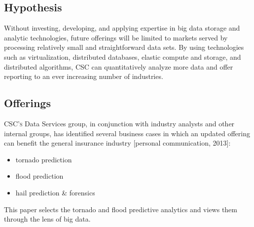 \subsection{Hypothesis}
Without investing, developing, and applying expertise in big data  storage and analytic technologies, future \climatedge offerings will be limited to markets served by processing relatively small and straightforward data sets. By using technologies such as virtualization, distributed databases, elastic compute and storage, and distributed algorithms, \textsc{CSC} can quantitatively analyze more data and offer \climatedge reporting to an ever increasing number of industries.
\subsection{Offerings}
\textsc{CSC's} Data Services group, in conjunction with industry analysts and other internal groups,  has identified several business cases  in which an updated \climatedge offering can benefit the general insurance industry [personal communication, 2013]:
\begin{itemize}
    \item tornado prediction
    \item flood prediction
    \item hail prediction \& forensics
\end{itemize}
 This paper selects the tornado and flood predictive analytics and views them through the lens of big data.
